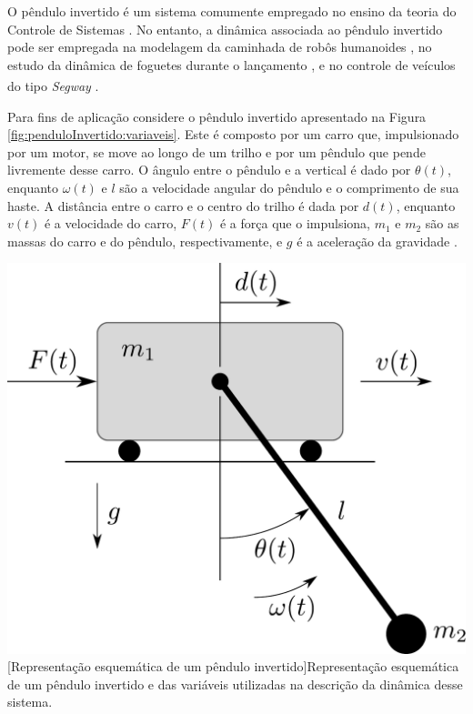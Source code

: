 
O pêndulo invertido é um sistema comumente empregado no ensino da teoria do Controle de Sistemas \cite{kelly_introduction_2017}. No entanto, a dinâmica associada ao pêndulo invertido pode ser empregada na modelagem da caminhada de robôs humanoides \cite{venancio_desenvolvimento_2018}, no estudo da dinâmica de foguetes durante o lançamento \cite{peltroche_advanced_2019}, e no controle de veículos do tipo \textit{Segway}\textsuperscript{\textregistered} \cite{younis_design_2009}.  

Para fins de aplicação considere o pêndulo invertido apresentado na Figura \ref{fig:penduloInvertido:variaveis}. Este é composto por um carro que, impulsionado por um motor, se move ao longo de um trilho e por um pêndulo que pende livremente desse carro. O ângulo entre o pêndulo e a vertical é dado por $ \theta(t) $, enquanto $ \omega(t) $ e $ l $ são a velocidade angular do pêndulo e o comprimento de sua haste. A distância entre o carro e o centro do trilho é dada por $ d(t) $, enquanto $ v(t) $ é a velocidade do carro, $ F(t) $ é a força que o impulsiona, $ m_1 $ e $ m_2 $ são as massas do carro e do pêndulo, respectivamente, e $ g $ é a aceleração da gravidade \cite{kelly_introduction_2017}.

\noindent	
\begin{minipage}{\textwidth}
	\vspace{\onelineskip}
	\centering
	\includegraphics[scale=0.3]{draw/resultados/pdf/pendulo}
	[Representação esquemática de um pêndulo invertido]{Representação esquemática de um pêndulo invertido e das variáveis utilizadas na descrição da dinâmica desse sistema.}
	\label{fig:penduloInvertido:variaveis}
	\vspace{\onelineskip}
\end{minipage}

